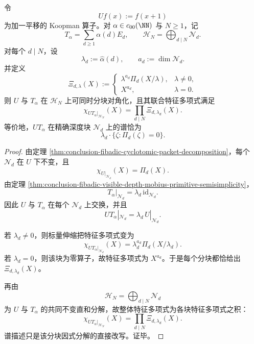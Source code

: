 \begin{theorem}\label{thm:conclusion-fibadic-koopman-depth-algebra-joint-spectrum}
令
\[
Uf(x):=f(x+1)
\]
为加一平移的 Koopman 算子。对 \(\alpha\in c_{00}(\NN)\) 与 \(N\ge 1\)，记
\[
T_\alpha=\sum_{d\ge 1}\alpha(d)E_d,
\qquad
\mathcal H_N=\bigoplus_{d\mid N}\mathcal N_d.
\]
对每个 \(d\mid N\)，设
\[
\lambda_d:=\widehat\alpha(d),
\qquad
a_d:=\dim \mathcal N_d.
\]
并定义
\[
\Xi_{d,\lambda}(X):=
\begin{cases}
\lambda^{a_d}\Pi_d(X/\lambda),& \lambda\neq 0,\\[4pt]
X^{a_d},& \lambda=0.
\end{cases}
\]
则 \(U\) 与 \(T_\alpha\) 在 \(\mathcal H_N\) 上可同时分块对角化，且其联合特征多项式满足
\[
\chi_{UT_\alpha|_{\mathcal H_N}}(X)=\prod_{d\mid N}\Xi_{d,\lambda_d}(X).
\]
等价地，\(UT_\alpha\) 在精确深度块 \(\mathcal N_d\) 上的谱恰为
\[
\lambda_d\cdot \{\zeta:\Pi_d(\zeta)=0\}.
\]
\end{theorem}
\begin{proof}
由定理 \ref{thm:conclusion-fibadic-cyclotomic-packet-decomposition}，每个 \(\mathcal N_d\) 在 \(U\) 下不变，且
\[
\chi_{U|_{\mathcal N_d}}(X)=\Pi_d(X).
\]
由定理 \ref{thm:conclusion-fibadic-visible-depth-mobius-primitive-semisimplicity}，
\[
T_\alpha|_{\mathcal N_d}=\lambda_d\,\mathrm{id}_{\mathcal N_d}.
\]
因此 \(U\) 与 \(T_\alpha\) 在每个 \(\mathcal N_d\) 上交换，并且
\[
UT_\alpha|_{\mathcal N_d}=\lambda_d\,U|_{\mathcal N_d}.
\]

若 \(\lambda_d\neq 0\)，则标量伸缩把特征多项式变为
\[
\chi_{UT_\alpha|_{\mathcal N_d}}(X)=\lambda_d^{a_d}\Pi_d(X/\lambda_d).
\]
若 \(\lambda_d=0\)，则该块为零算子，故特征多项式为 \(X^{a_d}\)。于是每个分块都恰给出 \(\Xi_{d,\lambda_d}(X)\)。

再由
\[
\mathcal H_N=\bigoplus_{d\mid N}\mathcal N_d
\]
为 \(U\) 与 \(T_\alpha\) 的共同不变直和分解，故整体特征多项式为各块特征多项式之积：
\[
\chi_{UT_\alpha|_{\mathcal H_N}}(X)=\prod_{d\mid N}\Xi_{d,\lambda_d}(X).
\]
谱描述只是该分块因式分解的直接改写。证毕。
\end{proof}

